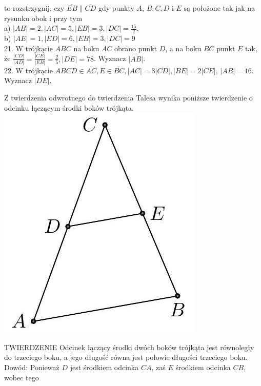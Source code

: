\documentclass[10pt]{article}
\begin{document}
to rozstrzygnij, czy \(\overline{E B} \| \overline{C D}\) gdy punkty \(A\), \(B, C, D\) i \(E\) są położone tak jak na rysunku obok i przy tym\\
a) \(|A B|=2,|A C|=5,|E B|=3,|D C|=\frac{15}{2}\).\\
b) \(|A E|=1,|E D|=6,|E B|=3,|D C|=9\)\\
21. W trójkącie \(A B C\) na boku \(A C\) obrano punkt \(D\), a na boku \(B C\) punkt \(E\) tak, że \(\frac{|C D|}{|A D|}=\frac{|C E|}{|E B|}=\frac{2}{5},|D E|=78\). Wyznacz \(|A B|\).\\
22. W trójkącie \(A B C D \in \overline{A C}, E \in \overline{B C},|A C|=3|C D|,|B E|=2|C E|\), \(|A B|=16\). Wyznacz \(|D E|\).

Z twierdzenia odwrotnego do twierdzenia Talesa wynika poniższe twierdzenie o odcinku łączącym środki boków trójkąta.\\
\includegraphics[max width=\textwidth, center]{2024_11_21_e9b4faa005d5be2cc318g-013(2)}

TWIERDZENIE Odcinek łączący środki dwóch boków trójkąta jest równoległy do trzeciego boku, a jego długość równa jest połowie długości trzeciego boku.\\
Dowód: Ponieważ \(D\) jest środkiem odcinka \(C A\), zaś \(E\) środkiem odcinka \(C B\), wobec tego
\end{document}

